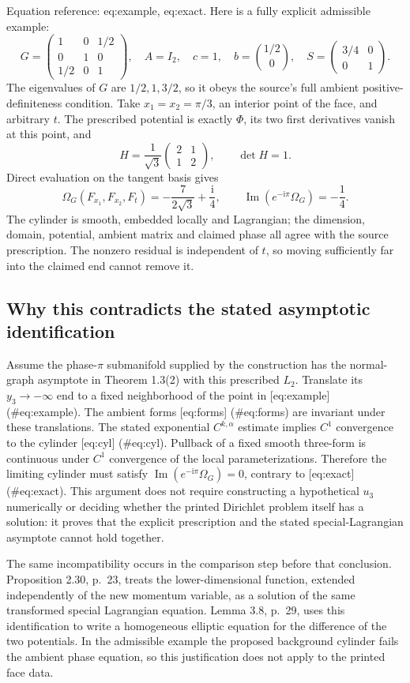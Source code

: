 \documentclass[10pt]{article}
\begin{document}
Equation reference: eq:example, eq:exact. Here is a fully explicit admissible example: \[
 G=\begin{pmatrix}1&0&1/2\\0&1&0\\1/2&0&1\end{pmatrix},
 \quad A=I_2,\quad c=1,\quad b=\binom{1/2}{0},
 \quad S=\begin{pmatrix}3/4&0\\0&1\end{pmatrix}.\] The eigenvalues of \(G\) are \(1/2,1,3/2\), so it obeys the source’s full ambient positive-definiteness condition. Take \(x_1=x_2=\pi/3\), an interior point of the face, and arbitrary \(t\). The prescribed potential is exactly \(\Phi\), its two first derivatives vanish at this point, and \[H=\frac1{\sqrt3}\begin{pmatrix}2&1\\1&2\end{pmatrix},
 \qquad \det H=1.\] Direct evaluation on the tangent basis gives \[
 \Omega_G(F_{x_1},F_{x_2},F_t)
   =-\frac{7}{2\sqrt3}+\frac{\mathrm i}{4},
 \qquad
 \operatorname{Im}(e^{-\mathrm i\pi}\Omega_G)=-\frac14.\] The cylinder is smooth, embedded locally and Lagrangian; the dimension, domain, potential, ambient matrix and claimed phase all agree with the source prescription. The nonzero residual is independent of \(t\), so moving sufficiently far into the claimed end cannot remove it.\par
\subsection*{Why this contradicts the stated asymptotic identification}
Assume the phase-\(\pi\) submanifold supplied by the construction has the normal-graph asymptote in Theorem 1.3(2) with this prescribed \(L_2\). Translate its \(y_3\to-\infty\) end to a fixed neighborhood of the point in [eq:example] (\#eq:example). The ambient forms [eq:forms] (\#eq:forms) are invariant under these translations. The stated exponential \(C^{k,\alpha}\) estimate implies \(C^1\) convergence to the cylinder [eq:cyl] (\#eq:cyl). Pullback of a fixed smooth three-form is continuous under \(C^1\) convergence of the local parameterizations. Therefore the limiting cylinder must satisfy \(\operatorname{Im}(e^{-\mathrm i\pi}\Omega_G)=0\), contrary to [eq:exact] (\#eq:exact). This argument does not require constructing a hypothetical \(u_3\) numerically or deciding whether the printed Dirichlet problem itself has a solution: it proves that the explicit prescription and the stated special-Lagrangian asymptote cannot hold together.\par
The same incompatibility occurs in the comparison step before that conclusion. Proposition 2.30, p. 23, treats the lower-dimensional function, extended independently of the new momentum variable, as a solution of the same transformed special Lagrangian equation. Lemma 3.8, p. 29, uses this identification to write a homogeneous elliptic equation for the difference of the two potentials. In the admissible example the proposed background cylinder fails the ambient phase equation, so this justification does not apply to the printed face data.\par
\end{document}
